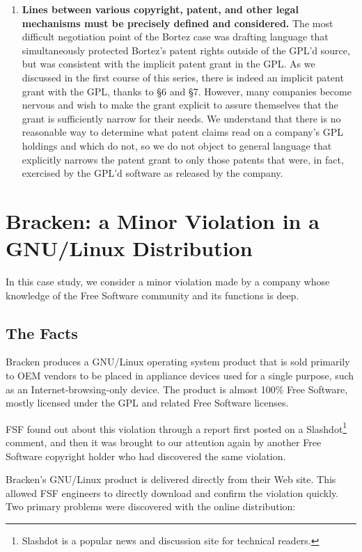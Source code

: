 \begin{enumerate}
\item {\bf Lines between various copyright, patent, and other legal
  mechanisms must be precisely defined and considered.}  The most
  difficult negotiation point of the Bortez case was drafting language
  that simultaneously protected Bortez's patent rights outside of the
  GPL'd source, but was consistent with the implicit patent grant in
  the GPL\@. As we discussed in the first course of this series, there is
  indeed an implicit patent grant with the GPL, thanks to \S 6 and \S 7.
  However, many companies become nervous and wish to make the grant
  explicit to assure themselves that the grant is sufficiently narrow for
  their needs. We understand that there is no reasonable way to determine
  what patent claims read on a company's GPL holdings and which do not, so
  we do not object to general language that explicitly narrows the patent
  grant to only those patents that were, in fact, exercised by the GPL'd
  software as released by the company.

\end{enumerate}

\chapter{Bracken: a Minor Violation in a GNU/Linux Distribution}

In this case study, we consider a minor violation made by a company whose
knowledge of the Free Software community and its functions is deep.

\section{The Facts} 

Bracken produces a GNU/Linux operating system product that is sold
primarily to OEM vendors to be placed in appliance devices used for a
single purpose, such as an Internet-browsing-only device. The product
is almost 100\% Free Software, mostly licensed under the GPL and related
Free Software licenses.

FSF found out about this violation through a report first posted on a
  Slashdot\footnote{Slashdot is a popular news and discussion site for
  technical readers.} comment, and then it was brought to our attention again
  by another Free Software copyright holder who had discovered the
  same violation.

Bracken's GNU/Linux product is delivered directly from their Web site.
This allowed FSF engineers to directly download and confirm the
violation quickly. Two primary problems were discovered with the
online distribution:

